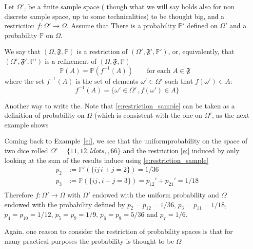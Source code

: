 		Let $\Omega'$, be a finite sample space ( though what we will say holds also for non discrete sample space, up to some technicalities) to be thought big, and a restriction $f:\Omega'\to \Omega$. Assume that There is a probability $\mathbb P'$ defined on $\Omega'$ and a probability $\mathbb P$ on $\Omega$. 
		\begin{definition}
			\label{d:restriction_sample}
			We say that $(\Omega,\mathfrak F, \mathbb P)$ is a restriction of $(\Omega', \mathfrak F', \mathbb P')$, or, equivalently, that $(\Omega', \mathfrak  F' , \mathbb P') $ is a refinement of $(\Omega,\mathfrak F,  \mathbb P)$ 
				\begin{equation}
					\label{e:restriction_sample}
					\mathbb P( A ) = \mathbb P(  f^{-1}(A) )\qquad \text{for each $A \in\mathfrak F$ }
				\end{equation}
			where the set $f^{-1}(A)$ is the set of elements $\omega' \in \Omega'$ such that $f(\omega') \in A$:
			\begin{equation}
				\label{e:preimage}
				f^{-1}(A) = \{ \omega' \in \Omega'\, , f(\omega' ) \in A\}
			\end{equation}
		\end{definition}
		Another way to write the. Note that \eqref{e;restriction_sample} can be taken as a definition of probability on $\Omega$ (which is consistent with the one on $\Omega'$, as the next example shows
		\begin{example}
			\label{e:dice_sum_1}
			Coming back to Example~\ref{e:}, we see that the uniformprobability on the space of two dice rolled $\Omega' = \{11,12,ldots, ,66\}$ and the restriction \eqref{e:} induced by only looking at the sum of the results induce using \eqref{e:restriction_sample}
			\begin{equation}
				\label{e:sum_prob}
				\begin{split}
					p_2 &:= \mathbb P'(\{ ij\, i + j = 2\}) = 1/36\\
					p_3 &:= \mathbb P(\{ij\,, i + j = 3 \}) = p_{12}' + p_{21}' = 1/18\\
				\end{split}
			\end{equation}
			Therefore $f:\Omega'\to \Omega$ with $\Omega'$ endowed with the uniform probability and $\Omega$ endowed with the probability defined by $p_2 = p_{12} = 1/36$, $p_3 = p_{11} = 1/18$, $p_{4} = p_{10} = 1/12$, $ p_5 = p_9 = 1/9$, $ p_6 = p_8 = 5/36$ and $p_7 = 1/6$. 
		\end{example}
		Again, one reason to consider the restriction of probability spaces is that for many practical purposes the probability is thought to be $\Omega$

